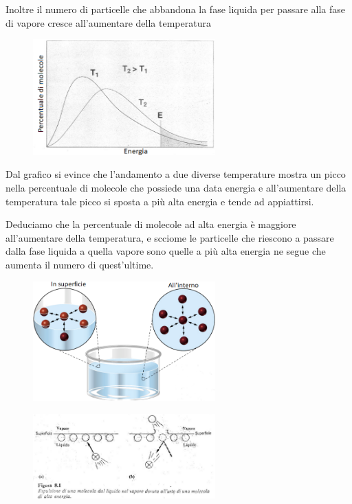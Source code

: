 Inoltre il numero di particelle che abbandona la fase liquida per passare alla fase di vapore cresce all'aumentare della temperatura

\hspace{0.5cm}\begin{minipage}{0.5 \textwidth}
    \begin{figure}[H]
        \includegraphics[width=7cm]{immagini/energie_fase_liquida.png}
    \end{figure}
\end{minipage}
\begin{minipage}{0.4 \textwidth}
\vspace{0.5cm}Dal grafico si evince che l'andamento a due diverse temperature mostra un picco nella percentuale di molecole che possiede una data energia e all'aumentare della temperatura tale picco si sposta a più alta energia e tende ad appiattirsi.
\end{minipage}

\vspace{0.2cm}Deduciamo che la percentuale di molecole ad alta energia è maggiore all'aumentare della temperatura, e scciome le particelle che riescono a passare dalla fase liquida a quella vapore sono quelle a più alta energia ne segue che aumenta il numero di quest'ultime.

\hspace{0.5cm}\begin{minipage}{0.5 \textwidth}
    \begin{figure}[H]
        \includegraphics[width=7cm]{immagini/interazioni_nel_liquido.png}
    \end{figure}
\end{minipage}
\begin{minipage}{0.5 \textwidth}
    \begin{figure}[H]
        \includegraphics[width=7cm]{immagini/espulsione_particelle.png}
    \end{figure}
\end{minipage}

